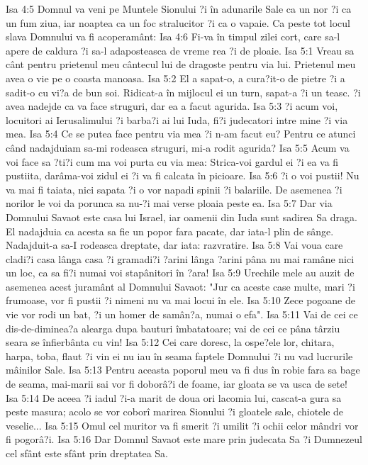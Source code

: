 Isa 4:5  Domnul va veni pe Muntele Sionului ?i în adunarile Sale ca un nor ?i ca un fum ziua, iar noaptea ca un foc stralucitor ?i ca o vapaie. Ca peste tot locul slava Domnului va fi acoperamânt:
Isa 4:6  Fi-va în timpul zilei cort, care sa-l apere de caldura ?i sa-l adaposteasca de vreme rea ?i de ploaie.
Isa 5:1  Vreau sa cânt pentru prietenul meu cântecul lui de dragoste pentru via lui. Prietenul meu avea o vie pe o coasta manoasa.
Isa 5:2  El a sapat-o, a cura?it-o de pietre ?i a sadit-o cu vi?a de bun soi. Ridicat-a în mijlocul ei un turn, sapat-a ?i un teasc. ?i avea nadejde ca va face struguri, dar ea a facut agurida.
Isa 5:3  ?i acum voi, locuitori ai Ierusalimului ?i barba?i ai lui Iuda, fi?i judecatori intre mine ?i via mea.
Isa 5:4  Ce se putea face pentru via mea ?i n-am facut eu? Pentru ce atunci când nadajduiam sa-mi rodeasca struguri, mi-a rodit agurida?
Isa 5:5  Acum va voi face sa ?ti?i cum ma voi purta cu via mea: Strica-voi gardul ei ?i ea va fi pustiita, darâma-voi zidul ei ?i va fi calcata în picioare.
Isa 5:6  ?i o voi pustii! Nu va mai fi taiata, nici sapata ?i o vor napadi spinii ?i balariile. De asemenea ?i norilor le voi da porunca sa nu-?i mai verse ploaia peste ea.
Isa 5:7  Dar via Domnului Savaot este casa lui Israel, iar oamenii din Iuda sunt sadirea Sa draga. El nadajduia ca acesta sa fie un popor fara pacate, dar iata-l plin de sânge. Nadajduit-a sa-I rodeasca dreptate, dar iata: razvratire.
Isa 5:8  Vai voua care cladi?i casa lânga casa ?i gramadi?i ?arini lânga ?arini pâna nu mai ramâne nici un loc, ca sa fi?i numai voi stapânitori în ?ara!
Isa 5:9  Urechile mele au auzit de asemenea acest juramânt al Domnului Savaot: "Jur ca aceste case multe, mari ?i frumoase, vor fi pustii ?i nimeni nu va mai locui în ele.
Isa 5:10  Zece pogoane de vie vor rodi un bat, ?i un homer de samân?a, numai o efa".
Isa 5:11  Vai de cei ce dis-de-diminea?a alearga dupa bauturi îmbatatoare; vai de cei ce pâna târziu seara se înfierbânta cu vin!
Isa 5:12  Cei care doresc, la ospe?ele lor, chitara, harpa, toba, flaut ?i vin ei nu iau în seama faptele Domnului ?i nu vad lucrurile mâinilor Sale.
Isa 5:13  Pentru aceasta poporul meu va fi dus în robie fara sa bage de seama, mai-marii sai vor fi doborâ?i de foame, iar gloata se va usca de sete!
Isa 5:14  De aceea ?i iadul ?i-a marit de doua ori lacomia lui, cascat-a gura sa peste masura; acolo se vor coborî marirea Sionului ?i gloatele sale, chiotele de veselie...
Isa 5:15  Omul cel muritor va fi smerit ?i umilit ?i ochii celor mândri vor fi pogorâ?i.
Isa 5:16  Dar Domnul Savaot este mare prin judecata Sa ?i Dumnezeul cel sfânt este sfânt prin dreptatea Sa.
